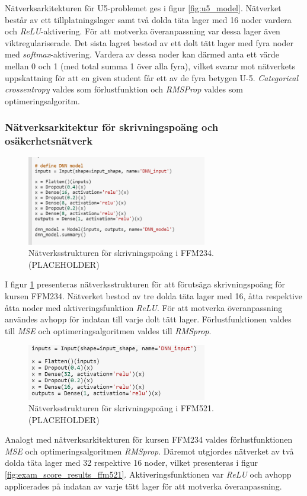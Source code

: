 Nätverksarkitekturen för U5-problemet ges i figur \ref{fig:u5_model}. Nätverket består av ett tillplatningslager samt två dolda täta lager med 16 noder vardera och \emph{ReLU}-aktivering. För att motverka överanpassning var dessa lager även viktregulariserade. Det sista lagret bestod av ett dolt tätt lager med fyra noder med \emph{softmax}-aktivering. Vardera av dessa noder kan därmed anta ett värde mellan 0 och 1 (med total summa 1 över alla fyra), vilket svarar mot nätverkets uppskattning för att en given student får ett av de fyra betygen U-5. \emph{Categorical crossentropy} valdes som förlustfunktion och \emph{RMSProp} valdes som optimeringsalgoritm. 



\subsubsection{Nätverksarkitektur för skrivningspoäng och osäkerhetsnätverk}
\label{sec:exam_score}
\begin{figure}[h]
    \centering
    \includegraphics[width=0.7\textwidth]{images/methodpictures/poang-ffm234.PNG}
    \caption{Nätverksstrukturen för skrivningspoäng i FFM234. (PLACEHOLDER)}
    \label{fig:exam_score_ffm234}
\end{figure}

I figur \ref{fig:exam_score_ffm234} presenteras nätverksstrukturen för att förutsäga skrivningspoäng för kursen FFM234. Nätverket bestod av tre dolda täta lager med 16, åtta respektive åtta noder med aktiveringsfunktion \emph{ReLU}. För att motverka överanpassning användes avhopp för indatan till varje dolt tätt lager. Förlustfunktionen valdes till \emph{MSE} och optimeringsalgoritmen valdes till \emph{RMSprop}.

\begin{figure}[h]
    \centering
    \includegraphics[width=0.7\textwidth]{images/methodpictures/poang-ffm521.PNG}
    \caption{Nätverksstrukturen för skrivningspoäng i FFM521. (PLACEHOLDER)}
    \label{fig:exam_score_ffm521}
\end{figure}
Analogt med nätverksarkitekturen för kursen FFM234 valdes förlustfunktionen \emph{MSE} och optimeringsalgoritmen \emph{RMSprop}. Däremot utgjordes nätverket av två dolda täta lager med 32 respektive 16 noder, vilket presenteras i figur \ref{fig:exam_score_results_ffm521}. Aktiveringsfunktionen var \emph{ReLU} och avhopp applicerades på indatan av varje tätt lager för att motverka överanpassning.

